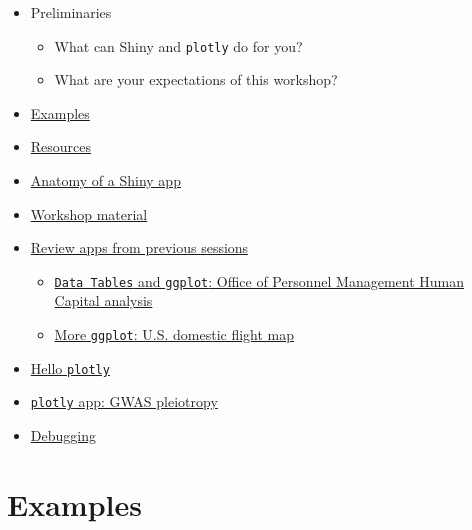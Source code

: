 \documentclass[10pt, letterpaper]{article}
\begin{document}
\begin{spacing}{1.0}
\begin{itemize}
    \item Preliminaries
      \begin{itemize}
        \item What can Shiny and \texttt{plotly} do for you?
        \item What are your expectations of this workshop?
      \end{itemize}
    \item \hyperref[sec:examples]{Examples}
    \item \hyperref[sec:resources]{Resources}
    \item \hyperref[sec:anatomyofapp]{Anatomy of a Shiny app}
    \item \hyperref[sec:accesworkshopmaterial]{Workshop material}
    \item \hyperref[sec:prevapps]{Review apps from previous sessions}
      \begin{itemize}
          \item \hyperref[sec:prevappOPM]{\texttt{Data Tables} and \texttt{ggplot}: Office of Personnel Management Human Capital analysis}
          \item \hyperref[sec:prevappfltmap]{More \texttt{ggplot}: U.S. domestic flight map}
      \end{itemize}
    \item \hyperref[sec:hello]{Hello \texttt{plotly}}
    \item \hyperref[sec:pleiotropy]{\texttt{plotly} app:  GWAS pleiotropy}
    \item \hyperref[sec:debugging]{Debugging}
\end{itemize}



\section{Examples}\label{sec:examples}


\end{spacing}
\end{document}
